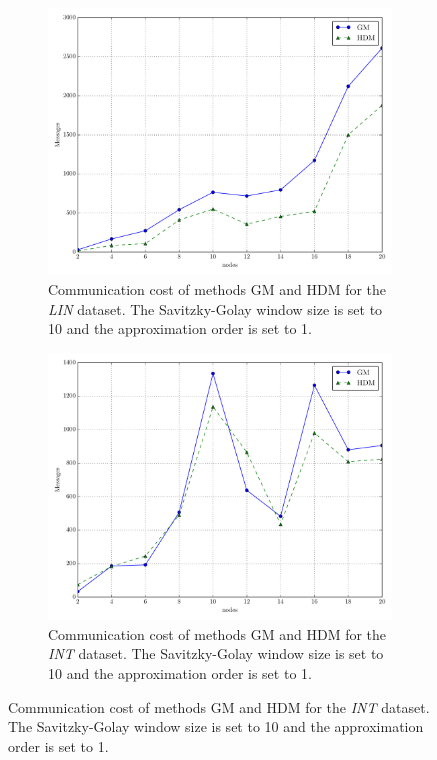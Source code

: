 \begin{figure}[!h]
\begin{subfigure}{0.32\textwidth}
  \includegraphics[width=\linewidth]{img/main_msg_linear_nodes.pdf}
  \caption{Communication cost of methods GM and HDM for the \emph{LIN} dataset. The Savitzky-Golay window size is set to 10 and the approximation order is set to 1.}
\end{subfigure}\hfill
\begin{subfigure}{0.32\textwidth}
  \includegraphics[width=\linewidth]{img/main_msg_interweaving_nodes.pdf}
  \caption{Communication cost of methods GM and HDM for the \emph{INT} dataset. The Savitzky-Golay window size is set to 10 and the approximation order is set to 1.}

\end{subfigure}
\end{figure}
